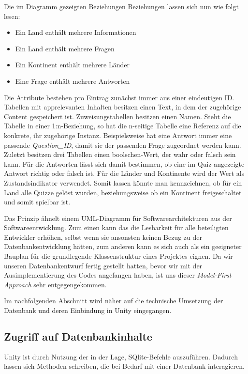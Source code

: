 Die im Diagramm gezeigten Beziehungen Beziehungen lassen sich nun wie folgt lesen:
\begin{itemize}
\item Ein Land enthält mehrere Informationen
\item Ein Land enthält mehrere Fragen
\item Ein Kontinent enthält mehrere Länder
\item Eine Frage enthält mehrere Antworten
\end{itemize}

Die Attribute bestehen pro Eintrag zunächst immer aus einer eindeutigen ID. Tabellen mit apprelevanten Inhalten besitzen einen Text, in dem der zugehörige Content gespeichert ist. Zuweisungstabellen besitzen einen Namen. Steht die Tabelle in einer 1:n-Beziehung, so hat die n-seitige Tabelle eine Referenz auf die konkrete, ihr zugehörige Instanz. Beispielsweise hat eine Antwort immer eine passende \textit{Question\_ID}, damit sie der passenden Frage zugeordnet werden kann. Zuletzt besitzen drei Tabellen einen boolschen-Wert, der wahr oder falsch sein kann. Für die Antworten lässt sich damit bestimmen, ob eine im Quiz angezeigte Antwort richtig oder falsch ist. Für die Länder und Kontinente wird der Wert als Zustandsindikator verwendet. Somit lassen könnte man kennzeichnen, ob für ein Land alle Quizze gelöst wurden, beziehungsweise ob ein Kontinent freigeschaltet und somit spielbar ist.

Das Prinzip ähnelt einem UML-Diagramm für Softwarearchitekturen aus der Softwareentwicklung. Zum einen kann das die Lesbarkeit für alle beteiligten Entwickler erhöhen, selbst wenn sie ansonsten keinen Bezug zu der Datenbankentwicklung hätten, zum anderen kann es sich auch als ein geeigneter Bauplan für die grundlegende Klassenstruktur eines Projektes eignen. Da wir unseren Datenbankentwurf fertig gestellt hatten, bevor wir mit der Ausimplementierung des Codes angefangen haben, ist uns dieser \textit{Model-First Approach} sehr entgegengekommen.

Im nachfolgenden Abschnitt wird näher auf die technische Umsetzung der Datenbank und deren Einbindung in Unity eingegangen.

\subsection{Zugriff auf Datenbankinhalte}\label{zugriff_datenbank}
Unity ist durch Nutzung der  in der Lage, SQlite-Befehle auszuführen. Dadurch lassen sich Methoden schreiben, die bei Bedarf mit einer Datenbank interagieren.

